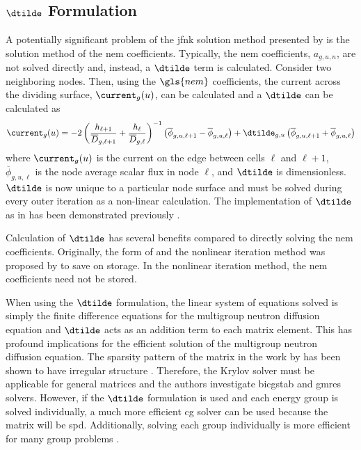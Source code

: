   \subsection{\texorpdfstring{$\dtilde$ Formulation}{D\textasciitilde \ Formulation}}
    \label{sec:dtilde_formulation}
    A potentially significant problem of the \gls{jfnk} solution method 
    presented by \citeauthor{qe2paper} is the solution method of the \gls{nem}
    coefficients. Typically, the \gls{nem} coefficients, $a_{g,u,n}$, are not
    solved directly and, instead, a $\dtilde$ term is calculated. Consider two
    neighboring nodes. Then, using the $\gls{nem}$ coefficients, the current
    across the dividing surface, $\current_g(u)$, can be calculated and a
    $\dtilde$ can be calculated as
    \begin{equation}
      \label{eq:dtilde}
      \current_g(u) = 
        -2 \left( \frac{h_{\ell+1}}{\overline{D}_{g,\ell+1}} + 
          \frac{h_{\ell}}{\overline{D}_{g,\ell}} \right)^{-1}
          \left( \overline{\phi}_{g,u,\ell+1} -
          \overline{\phi}_{g,u,\ell} \right) + 
        \dtilde_{g,u} \left( \overline{\phi}_{g,u,\ell+1} +
          \overline{\phi}_{g,u,\ell} \right)
    \end{equation}
    where $\current_g(u)$ is the current on the edge between cells $\ell$ and
    $\ell+1$, $\overline{\phi}_{g,u,\ell}$ is the node average scalar flux in
    node $\ell$, and $\dtilde$ is dimensionless. $\dtilde$ is now unique to a
    particular node surface and must be solved during every outer iteration as a
    non-linear calculation. The implementation of $\dtilde$ as in
     has been demonstrated previously \cite{palmtagThesis}.

    Calculation of $\dtilde$ has several benefits compared to directly solving
    the \gls{nem} coefficients. Originally, the form of  and the
    nonlinear iteration method was proposed by \citeauthor{smith_nonlinear} to
    save on storage. In the nonlinear iteration method, the \gls{nem}
    coefficients need not be stored.

    When using the $\dtilde$ formulation, the linear system of equations solved
    is simply the finite difference equations for the multigroup neutron
    diffusion equation and $\dtilde$ acts as an addition term to each matrix
    element. This has profound implications for the efficient solution of the
    multigroup neutron diffusion equation. The sparsity pattern of the matrix in
    the work by \citeauthor{qe2paper} has been shown to have irregular structure
    \cite{palmtagThesis}. Therefore, the Krylov solver must be applicable for
    general matrices and the authors investigate \gls{bicgstab} and \gls{gmres}
    solvers. However, if the $\dtilde$ formulation is used and each energy group
    is solved individually, a much more efficient \gls{cg} solver can be used
    because the matrix will be \gls{spd}. Additionally, solving each group
    individually is more efficient for many group problems \cite{my_ms_thesis}.

